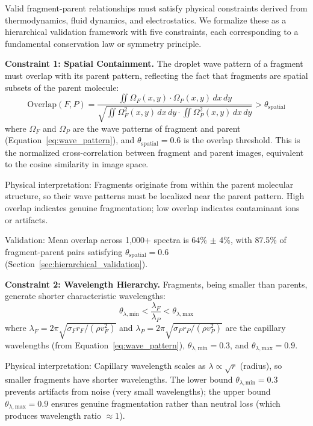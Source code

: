\documentclass[11pt,twocolumn]{article}
\begin{document}
Valid fragment-parent relationships must satisfy physical constraints derived from thermodynamics, fluid dynamics, and electrostatics. We formalize these as a hierarchical validation framework with five constraints, each corresponding to a fundamental conservation law or symmetry principle.

\textbf{Constraint 1: Spatial Containment.} The droplet wave pattern of a fragment must overlap with its parent pattern, reflecting the fact that fragments are spatial subsets of the parent molecule:
\begin{equation}
    \text{Overlap}(F, P) = \frac{\iint \Omega_F(x,y) \cdot \Omega_P(x,y) \, dx\, dy}{\sqrt{\iint \Omega_F^2(x,y) \, dx\, dy \cdot \iint \Omega_P^2(x,y) \, dx\, dy}} > \theta_{\text{spatial}}
    \label{eq:spatial_containment}
\end{equation}
where $\Omega_F$ and $\Omega_P$ are the wave patterns of fragment and parent (Equation~\ref{eq:wave_pattern}), and $\theta_{\text{spatial}} = 0.6$ is the overlap threshold. This is the normalized cross-correlation between fragment and parent images, equivalent to the cosine similarity in image space.

Physical interpretation: Fragments originate from within the parent molecular structure, so their wave patterns must be localized near the parent pattern. High overlap indicates genuine fragmentation; low overlap indicates contaminant ions or artifacts.

Validation: Mean overlap across 1,000+ spectra is 64\% $\pm$ 4\%, with 87.5\% of fragment-parent pairs satisfying $\theta_{\text{spatial}} = 0.6$ (Section~\ref{sec:hierarchical_validation}).

\textbf{Constraint 2: Wavelength Hierarchy.} Fragments, being smaller than parents, generate shorter characteristic wavelengths:
\begin{equation}
    \theta_{\lambda,\text{min}} < \frac{\lambda_F}{\lambda_P} < \theta_{\lambda,\text{max}}
    \label{eq:wavelength_hierarchy}
\end{equation}
where $\lambda_F = 2\pi\sqrt{\sigma_F r_F / (\rho v_F^2)}$ and $\lambda_P = 2\pi\sqrt{\sigma_P r_P / (\rho v_P^2)}$ are the capillary wavelengths (from Equation~\ref{eq:wave_pattern}), $\theta_{\lambda,\text{min}} = 0.3$, and $\theta_{\lambda,\text{max}} = 0.9$.

Physical interpretation: Capillary wavelength scales as $\lambda \propto \sqrt{r}$ (radius), so smaller fragments have shorter wavelengths. The lower bound $\theta_{\lambda,\text{min}} = 0.3$ prevents artifacts from noise (very small wavelengths); the upper bound $\theta_{\lambda,\text{max}} = 0.9$ ensures genuine fragmentation rather than neutral loss (which produces wavelength ratio $\approx 1$).
\end{document}
